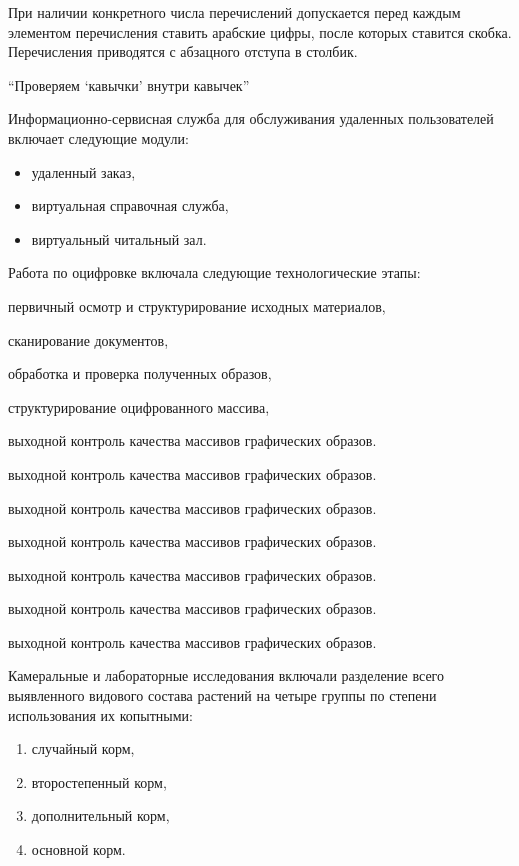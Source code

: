 При наличии конкретного числа перечислений допускается перед каждым элементом
перечисления ставить арабские цифры, после которых ставится скобка.
Перечисления приводятся с абзацного отступа в столбик.

\enquote{Проверяем \enquote{кавычки} внутри кавычек}

Информационно-сервисная служба для обслуживания удаленных пользователей включает следующие
модули:
\begin{itemize}
\item удаленный заказ,
\item виртуальная справочная служба,
\item виртуальный читальный зал.
\end{itemize}

Работа по оцифровке включала следующие технологические этапы:
\begin{asblist}
    \item первичный осмотр и структурирование исходных материалов,
    \item сканирование документов,
    \item обработка и проверка полученных образов,
    \item структурирование оцифрованного массива,
    \item выходной контроль качества массивов графических образов.
    \item выходной контроль качества массивов графических образов.
    \item выходной контроль качества массивов графических образов.
    \item выходной контроль качества массивов графических образов.
    \item выходной контроль качества массивов графических образов.
    \item выходной контроль качества массивов графических образов.
    \item выходной контроль качества массивов графических образов.
\end{asblist}

Камеральные и лабораторные исследования включали разделение всего выявленного
видового состава растений на четыре группы по степени использования их копытными:
\begin{enumerate}
    \item случайный корм,
    \item второстепенный корм,
    \item дополнительный корм,
    \item основной корм.
\end{enumerate}

